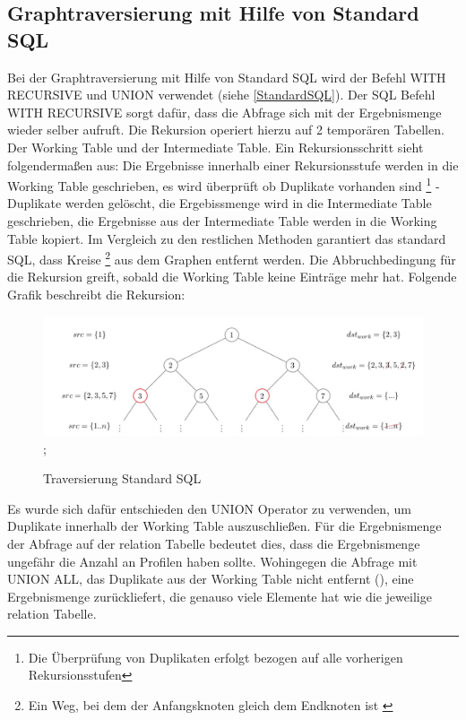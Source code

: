 \subsection{Graphtraversierung mit Hilfe von Standard \ac{SQL}}
Bei der Graphtraversierung mit Hilfe von Standard \ac{SQL} wird der Befehl WITH RECURSIVE und UNION verwendet (siehe \ref{StandardSQL}). Der SQL Befehl WITH RECURSIVE
sorgt dafür, dass die Abfrage sich mit der Ergebnismenge wieder selber aufruft. Die Rekursion operiert hierzu auf 2 temporären Tabellen. Der Working Table und der Intermediate
Table. Ein Rekursionsschritt sieht folgendermaßen aus: Die Ergebnisse innerhalb einer Rekursionsstufe werden in die Working Table geschrieben, es wird überprüft ob Duplikate
vorhanden sind \footnote{Die Überprüfung von Duplikaten erfolgt bezogen auf alle vorherigen Rekursionsstufen} - Duplikate werden gelöscht, die Ergebissmenge wird in
die Intermediate Table geschrieben, die Ergebnisse aus der Intermediate Table werden in die Working Table kopiert. Im Vergleich zu den restlichen Methoden garantiert
das standard SQL, dass Kreise \footnote{Ein Weg, bei dem der Anfangsknoten gleich dem Endknoten ist \cite[S.48]{pbeck01}} aus dem Graphen entfernt werden.
Die Abbruchbedingung für die Rekursion greift, sobald die Working Table keine Einträge mehr hat. Folgende Grafik beschreibt die Rekursion:
\begin{figure}[H]
    \includegraphics[width = \linewidth]{images/RecursiveSelect.jpg};
    \caption{Traversierung Standard SQL}
\end{figure}
Es wurde sich dafür entschieden den UNION Operator zu verwenden, um Duplikate innerhalb der Working Table auszuschließen. Für die  Ergebnismenge der Abfrage auf der
relation Tabelle bedeutet dies, dass die Ergebnismenge ungefähr die Anzahl an Profilen haben sollte. Wohingegen die Abfrage mit UNION ALL, das Duplikate aus der
Working Table nicht entfernt (\cite{postgresWithRecursive}), eine Ergebnismenge zurückliefert, die genauso viele Elemente hat wie die jeweilige relation Tabelle.

